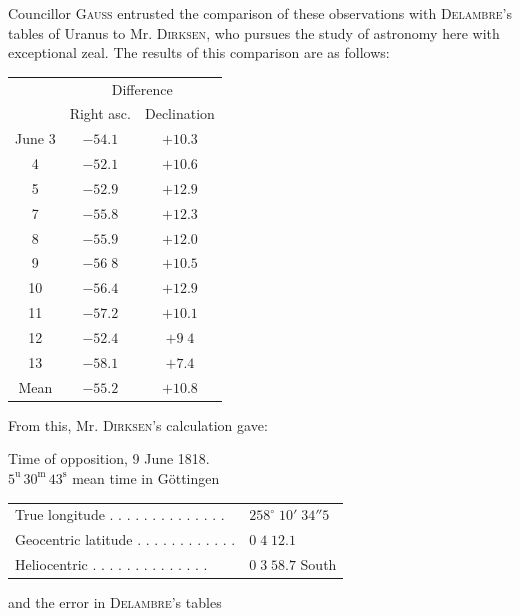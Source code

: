 \par\indent Councillor \textsc{Gauss} entrusted the comparison of these observations with \textsc{Delambre}’s tables of Uranus to Mr. \textsc{Dirksen}, who pursues the study of astronomy here with exceptional zeal. The results of this comparison are as follows:

\begin{center}
\begin{tabular}{c|cc}
& \multicolumn{2}{c}{Difference} \\
& Right asc. & Declination \\
\hline
June 3 & $-54.1$ & $+10.3$ \\
4 & $-52.1$ & $+10.6$ \\
5 & $-52.9$ & $+12.9$ \\
7 & $-55.8$ & $+12.3$ \\
8 & $-55.9$ & $+12.0$ \\
9 & $-56\;8$ & $+10.5$ \\
10 & $-56.4$ & $+12.9$ \\
11 & $-57.2$ & $+10.1$ \\
12 & $-52.4$ & $+9\;4$ \\ 
13 & $-58.1$ & $+7.4$ \\
\hline
Mean & $-55.2$ & $+10.8$ \\
\end{tabular}
\end{center}

\par\indent From this, Mr. \textsc{Dirksen}’s calculation gave:

\begin{center}
Time of opposition, 9 June 1818.\\
$5^{\mathrm u}\,30^{\mathrm m}\,43^{\mathrm s}$ mean time in Göttingen
\end{center}
\begin{center}
\begin{tabular}{ll}
True longitude . . . . . . . . . . . . . . & $258^\circ\;10'\;34''5$ \\
Geocentric latitude . . . . . . . . . . . . & $0\;4\;12.1$ \\
Heliocentric . . . . . . . . . . . . . . & $0\;3\;58.7$ South \\
\end{tabular}
\end{center}

\noindent and the error in \textsc{Delambre}’s tables

